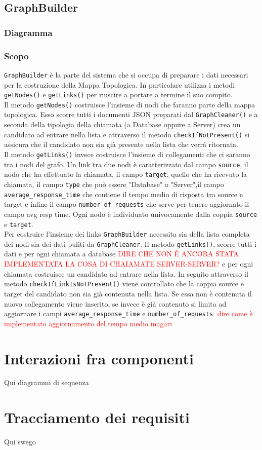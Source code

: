 \subsection{GraphBuilder}
\label{sec:GraphBuilder}
	\subsubsection{Diagramma}

	\subsubsection{Scopo}
	\texttt{GraphBuilder} è la parte del sistema che si occupa di preparare i dati necessari per la costruzione della Mappa Topologica. In particolare utilizza i metodi \texttt{getNodes()} e \texttt{getLinks()} per riuscire a portare a termine il suo compito.\\
	Il metodo \texttt{getNodes()} costruisce l'insieme di nodi che faranno parte della mappa topologica. Esso scorre tutti i documenti JSON preparati dal \texttt{GraphCleaner()} e a seconda della tipologia della chiamata (a Database oppure a Server) crea un candidato ad entrare nella lista e attraverso il metodo \texttt{checkIfNotPresent()} si assicura che il candidato non sia già presente nella lista che verrà ritornata.\\
	Il metodo \texttt{getLinks()} invece costruisce l'insieme di collegamenti che ci saranno tra i nodi del grafo. Un link tra due nodi è caratterizzato dal campo \texttt{source}, il nodo che ha effettuato la chiamata, il campo \texttt{target}, quello che ha ricevuto la chiamata, il campo \texttt{type} che può essere "Database" o "Server",il campo \texttt{average\_response\_time} che contiene il tempo medio di risposta tra source e target e infine il campo \texttt{number\_of\_requests} che serve per tenere aggiornato il campo avg resp time. Ogni nodo è individuato univocamente dalla coppia \texttt{source} e \texttt{target}.\\	
	Per costruire l'insieme dei links \texttt{GraphBuilder} necessita sia della lista completa dei nodi sia dei dati puliti da \texttt{GraphCleaner}. Il metodo \texttt{getLinks()}, scorre tutti i dati e per ogni chiamata a database \textcolor{red}{DIRE CHE NON È ANCORA STATA IMPLEMENTATA LA COSA DI CHAIAMATE SERVER-SERVER?} e per ogni chiamata costruisce un candidato ad entrare nella lista. In seguito attraverso il metodo \texttt{checkIfLinkIsNotPresent()} viene controllato che la coppia source e target del candidato non sia già contenuta nella lista. Se essa non è contenuta il nuovo collegamento viene inserito, se invece è già contenuto si limita ad aggiornare i campi \texttt{average\_response\_time} e \texttt{number\_of\_requests}. \textcolor{red}{dire come è implementato aggiornamento del tempo medio magari}


\section{Interazioni fra componenti}
\label{sec:Interazioni}
Qui diagrammi di sequenza

\section{Tracciamento dei requisiti}
\label{sec:Tracciamento}
Qui swego 

